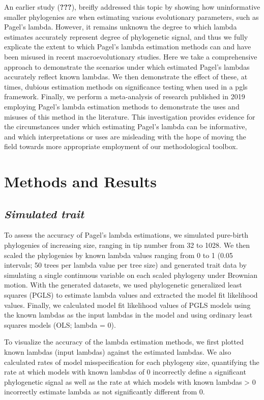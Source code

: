 \documentclass[]{article}
\begin{document}
An earlier study ({\textbf{???}}), breifly addressed this topic by
showing how uninformative smaller phylogenies are when estimating
various evolutionary parameters, such as Pagel's lambda. However, it
remains unknown the degree to which lambda estimates accurately
represent degree of phylogenetic signal, and thus we fully explicate the
extent to which Pagel's lambda estimation methods can and have been
misused in recent macroevolutionary studies. Here we take a
comprehensive approach to demonstrate the scenarios under which
estimated Pagel's lambdas accurately reflect known lambdas. We then
demonstrate the effect of these, at times, dubious estimation methods on
significance testing when used in a pgls framework. Finally, we perform
a meta-analysis of research published in 2019 employing Pagel's lambda
estimation methods to demonstrate the uses and misuses of this method in
the literature. This investigation provides evidence for the
circumstances under which estimating Pagel's lambda can be informative,
and which interpretations or uses are misleading with the hope of moving
the field towards more appropriate employment of our methodological
toolbox.

\section{Methods and Results}\label{methods-and-results}

\subsection{\texorpdfstring{\emph{Simulated
trait}}{Simulated trait}}\label{simulated-trait}

To assess the accuracy of Pagel's lambda estimations, we simulated
pure-birth phylogenies of increasing size, ranging in tip number from 32
to 1028. We then scaled the phylogenies by known lambda values ranging
from 0 to 1 (0.05 intervals; 50 trees per lambda value per tree size)
and generated trait data by simulating a single continuous variable on
each scaled phylogeny under Brownian motion. With the generated
datasets, we used phylogenetic generalized least squares (PGLS) to
estimate lambda values and extracted the model fit likelihood values.
Finally, we calculated model fit likelihood values of PGLS models using
the known lambdas as the input lambdas in the model and using ordinary
least squares models (OLS; lambda = 0). \hfill\break

To visualize the accuracy of the lambda estimation methods, we first
plotted known lambdas (input lambdas) against the estimated lambdas. We
also calculated rates of model misspecification for each phylogeny size,
quantifying the rate at which models with known lambdas of 0 incorrectly
define a significant phylogenetic signal as well as the rate at which
models with known lambdas \textgreater{} 0 incorrectly estimate lambda
as not significantly different from 0. \hfill\break
\end{document}
